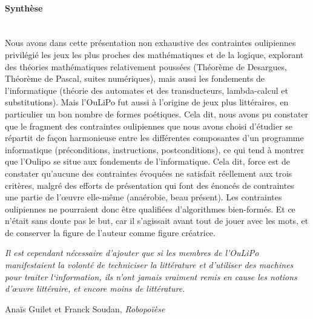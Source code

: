 \documentclass{article}
\newcommand{\subsubsubsection}[1]{\paragraph{#1}\mbox{}\\}
\newenvironment{citationbox}
{\begin{center}
		\begin{minipage}{.8\textwidth}
		}
		{
		\end{minipage}	
\end{center}
}
\begin{document}
				
				
				
				\subsubsubsection{Synthèse}
					Nous avons dans cette présentation non exhaustive des contraintes oulipiennes privilégié les jeux les plus proches des mathématiques et de la logique, explorant des théories mathématiques relativement poussées (Théorème de Desargues, Théorème de Pascal, suites numériques), mais aussi les fondements de l'informatique (théorie des automates et des transducteurs, lambda-calcul et substitutions). Mais l'OuLiPo fut aussi à l'origine de jeux plus littéraires, en particulier un bon nombre de formes poétiques. Cela dit, nous avons pu constater que le fragment des contraintes oulipiennes que nous avons choisi d'étudier se répartit de façon harmonieuse entre les différentes composantes d'un programme informatique (préconditions, instructions, postconditions), ce qui tend à montrer que l'Oulipo se situe aux fondements de l'informatique. Cela dit, force est de constater qu'aucune des contraintes évoquées ne satisfait réellement aux trois critères, malgré des efforts de présentation qui font des énoncés de contraintes une partie de l'œuvre elle-même (anaérobie, beau présent). Les contraintes oulipiennes ne pourraient donc être qualifiées d'algorithmes bien-formés. Et ce n'était sans doute pas le but, car il s'agissait avant tout de jouer avec les mots, et de conserver la figure de l'auteur comme figure créatrice.
				
					\begin{citationbox}
						\textit{Il est cependant nécessaire d'ajouter que si les membres de l'OuLiPo manifestaient la volonté de techniciser la littérature et d'utiliser des machines pour traiter l‘information, ils n'ont jamais vraiment remis en cause les notions d'œuvre littéraire, et encore moins de littérature.}
						\begin{flushright}
							Anaïs Guilet et Franck Soudan, \textit{Robopoïèse}\cite{guilet2017}
						\end{flushright}
					\end{citationbox}
					
\end{document}
